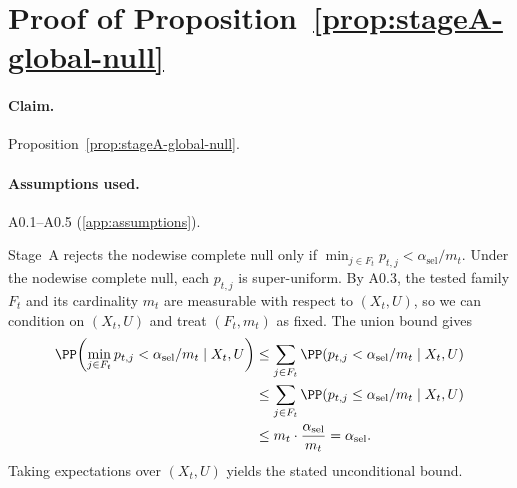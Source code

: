 \section{Proof of Proposition~\ref{prop:stageA-global-null}}
\label{app:proof-stageA-global}

\paragraph{Claim.} Proposition~\ref{prop:stageA-global-null}.
\paragraph{Assumptions used.} A0.1--A0.5 (\cref{app:assumptions}).

Stage~A rejects the nodewise complete null only if
$\min_{j \in F_t} p_{t,j} < \alpha_{\mathrm{sel}}/m_t$. Under the nodewise complete null,
each $p_{t,j}$ is super-uniform. By A0.3, the tested family $F_t$ and its
cardinality $m_t$ are measurable with respect to $(X_t,U)$, so we can condition
on $(X_t,U)$ and treat $(F_t,m_t)$ as fixed. The union bound gives
%
\begin{equation}
  \begin{aligned}
    \PP\!\left(\min_{j \in F_t} p_{t,j} < \alpha_{\mathrm{sel}}/m_t \mid X_t,U\right)
    &\le \sum_{j \in F_t} \PP(p_{t,j} < \alpha_{\mathrm{sel}}/m_t \mid X_t,U) \\
    &\le \sum_{j \in F_t} \PP(p_{t,j} \le \alpha_{\mathrm{sel}}/m_t \mid X_t,U) \\
    &\le m_t \cdot \frac{\alpha_{\mathrm{sel}}}{m_t}
    = \alpha_{\mathrm{sel}}.
  \end{aligned}
\end{equation}
%
Taking expectations over $(X_t,U)$ yields the stated unconditional bound.

